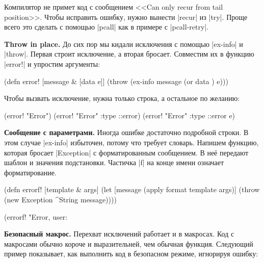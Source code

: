 Компилятор не примет код с сообщением <<Can only recur from tail
position>>. Чтобы исправить ошибку, нужно вынести \spverb|recur| из
\spverb|try|. Проще всего это сделать с помощью \spverb|pcall| как в примере с
\spverb|pcall-retry|.

\textbf{Throw in place.} До сих пор мы кидали исключения с помощью
\spverb|ex-info| и \spverb|throw|. Первая строит исключение, а вторая
бросает. Совместим их в функцию \spverb|error!| и упростим аргументы:


\begin{english}
  \begin{clojure}
(defn error! [message & [data e]]
  (throw (ex-info message (or data {}) e)))
  \end{clojure}
\end{english}

\noindent
Чтобы вызвать исключение, нужна только строка, а остальное по желанию:

\begin{english}
  \begin{clojure}
(error! "Error")
(error! "Error" {:type ::error})
(error! "Error" {:type ::error} e)
  \end{clojure}
\end{english}

\textbf{Сообщение с параметрами.} Иногда ошибке достаточно подробной строки. В
этом случае \spverb|ex-info| избыточен, потому что требует словарь. Напишем
функцию, которая бросает \spverb|Exception| с форматированным сообщением. В
не\"{е} передают шаблон и значения подстановки. Частичка \spverb|f| на конце
имени означает форматирование.


\begin{english}
  \begin{clojure}
(defn errorf! [template & args]
  (let [message (apply format template args)]
    (throw (new Exception ^String message))))

(errorf! "Error, user: %
  \end{clojure}
\end{english}

\textbf{Безопасный макрос.} Перехват исключений работает и в макросах. Код с
макросами обычно короче и выразительней, чем обычная функция. Следующий пример
показывает, как выполнить код в безопасном режиме, игнорируя ошибку:


